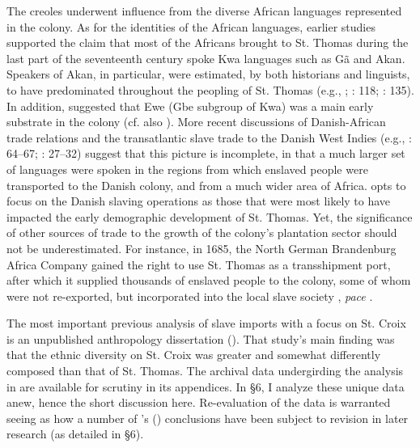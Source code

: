\documentclass[output=paper,colorlinks,citecolor=brown]{langscibook}
\begin{document}
The creoles underwent influence from the diverse African languages represented in the colony. As for the identities of the African languages, earlier studies supported the claim that most of the Africans brought to St. Thomas during the last part of the seventeenth century spoke Kwa languages such as G\~a and Akan. Speakers of Akan, in particular, were estimated, by both historians and linguists, to have predominated throughout the peopling of St. Thomas (e.g., \cite{Feldbaek_Justesen_1980}; \cite{Stolz_Stein_1986}: 118; \cite{Parkvall_2000}: 135). In addition, \citet{Sabino_1988} suggested that Ewe (Gbe subgroup of Kwa) was a main early substrate in the colony (cf. also \cite{Sabino_2012}). More recent discussions of Danish-African trade relations and the transatlantic slave trade to the Danish West Indies (e.g., \cite{Sabino_2012}: 64–67; \cite{vanSluijs_2017}: 27–32) suggest that this picture is incomplete, in that a much larger set of languages were spoken in the regions from which enslaved people were transported to the Danish colony, and from a much wider area of Africa. \citet[65]{Sabino_2012} opts to focus on the Danish slaving operations as those that were most likely to have impacted the early demographic development of St. Thomas. Yet, the significance of other sources of trade to the growth of the colony’s plantation sector should not be underestimated. For instance, in 1685, the North German Brandenburg Africa Company gained the right to use St. Thomas as a transshipment port, after which it supplied thousands of enslaved people to the colony, some of whom were not re-exported, but incorporated into the local slave society \citep[254--257]{Weindl_2008}, \emph{pace} \citet[65]{Sabino_2012}. 

The most important previous analysis of slave imports with a focus on St. Croix is an unpublished anthropology dissertation (\cite{Pope_1970}). That study's main finding was that the ethnic diversity on St. Croix was greater and somewhat differently composed than that of St. Thomas. The archival data undergirding the analysis in \citet{Pope_1970} are available for scrutiny in its appendices. In §6, I analyze these unique data anew, hence the short discussion here. Re-evaluation of the data is warranted seeing as how a number of \citeauthor{Pope_1970}’s (\citeyear{Pope_1970}) conclusions have been subject to revision in later research (as detailed in §6).
\end{document}
